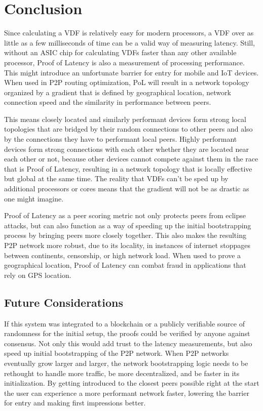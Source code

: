 \chapter{Conclusion}
\label{Conclusion}
Since calculating a VDF is relatively easy for modern processors, a VDF over as little as a few milliseconds of time can be a valid way of measuring latency. Still, without an ASIC chip for calculating VDFs faster than any other available processor, Proof of Latency is also a measurement of processing performance. This might introduce an unfortunate barrier for entry for mobile and IoT devices. When used in P2P routing optimization, PoL will result in a network topology organized by a gradient that is defined by geographical location, network connection speed and the similarity in performance between peers.

This means closely located and similarly performant devices form strong local topologies that are bridged by their random connections to other peers and also by the connections they have to performant local peers. Highly performant devices form strong connections with each other whether they are located near each other or not, because other devices cannot compete against them in the race that is Proof of Latency, resulting in a network topology that is locally effective but global at the same time. The reality that VDFs can't be sped up by additional processors or cores means that the gradient will not be as drastic as one might imagine.

Proof of Latency as a peer scoring metric not only protects peers from eclipse attacks, but can also function as a way of speeding up the initial bootstrapping process by bringing peers more closely together. This also makes the resulting P2P network more robust, due to its locality, in instances of internet stoppages between continents, censorship, or high network load. When used to prove a geographical location, Proof of Latency can combat fraud in applications that rely on GPS location.

\section{Future Considerations}
If this system was integrated to a blockchain or a publicly verifiable source of randomness for the initial setup, the proofs could be verified by anyone against consensus. Not only this would add trust to the latency measurements, but also speed up initial bootstrapping of the P2P network. When P2P networks eventually grow larger and larger, the network bootstrapping logic needs to be rethought to handle more traffic, be more decentralized, and be faster in its initialization. By getting introduced to the closest peers possible right at the start the user can experience a more performant network faster, lowering the barrier for entry and making first impressions better.

